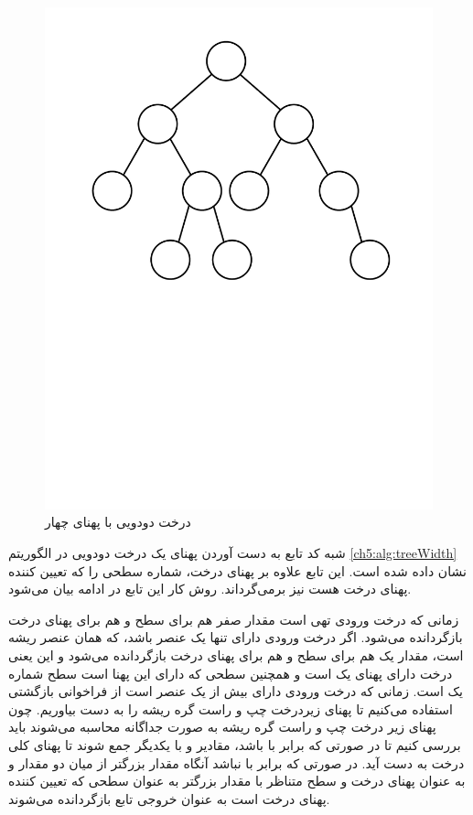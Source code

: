 \begin{figure}
\begin{center}
\includegraphics[scale=0.4]{figs/ch5/tree_width.pdf}
\end{center}\caption{درخت دودویی با پهنای چهار}\label{ch5:fig:treeWidth}
\end{figure}


شبه کد تابع به دست آوردن پهنای یک درخت دودویی در الگوریتم {\eqref{ch5:alg:treeWidth}} نشان داده شده است. این تابع علاوه بر پهنای درخت، شماره سطحی را که تعیین کننده پهنای درخت هست نیز برمی‌گرداند. روش کار این تابع در ادامه بیان می‌شود.

زمانی که درخت ورودی تهی است مقدار صفر هم برای سطح و هم برای پهنای درخت بازگردانده می‌شود. اگر درخت ورودی دارای تنها یک عنصر باشد، که همان عنصر ریشه است، مقدار یک هم برای سطح و هم برای پهنای درخت بازگردانده می‌شود و این یعنی درخت دارای پهنای یک است و همچنین سطحی که دارای این پهنا است سطح شماره یک است. زمانی که درخت ورودی دارای بیش از یک عنصر است از فراخوانی بازگشتی استفاده می‌کنیم تا پهنای زیردرخت چپ و راست گره ریشه را به دست بیاوریم. چون پهنای زیر درخت چپ و راست گره ریشه به صورت جداگانه محاسبه می‌شوند باید بررسی کنیم تا در صورتی که {} برابر با {} باشد، مقادیر {} و {} با یکدیگر جمع شوند تا پهنای کلی درخت به دست آید. در صورتی که {} برابر با {} نباشد آنگاه مقدار بزرگتر از میان دو مقدار {} و {} به عنوان پهنای درخت و سطح متناظر با مقدار بزرگتر به عنوان سطحی که تعیین کننده پهنای درخت است به عنوان خروجی تابع بازگردانده می‌شوند.

